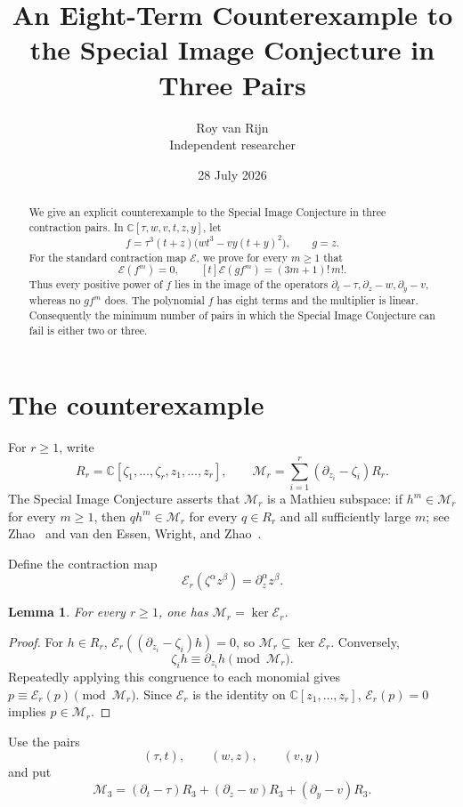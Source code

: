 \documentclass[11pt]{article}
\title{An Eight-Term Counterexample to the Special Image Conjecture
  in Three Pairs}
\author{Roy van Rijn\\{\small Independent researcher}}
\date{28 July 2026}
\newtheorem{lemma}[theorem]{Lemma}
\newcommand{\C}{\mathbb C}
\newcommand{\Eop}{\mathcal E}
\newcommand{\M}{\mathcal M}
\begin{document}
\maketitle

\begin{abstract}
We give an explicit counterexample to the Special Image Conjecture in
three contraction pairs.  In
\(\C[\tau,w,v,t,z,y]\), let
\[
 f=\tau^3(t+z)\bigl(wt^3-vy(t+y)^2\bigr),\qquad g=z.
\]
For the standard contraction map \(\Eop\), we prove for every \(m\geq1\)
that
\[
 \Eop(f^m)=0,\qquad [t]\Eop(gf^m)=(3m+1)!\,m!.
\]
Thus every positive power of \(f\) lies in the image of the operators
\(\partial_t-\tau,\partial_z-w,\partial_y-v\), whereas no \(gf^m\)
does.  The polynomial \(f\) has eight terms and the multiplier is linear.
Consequently the minimum number of pairs in which the Special Image
Conjecture can fail is either two or three.
\end{abstract}

\section{The counterexample}

For \(r\geq1\), write
\[
 R_r=\C[\zeta_1,\ldots,\zeta_r,z_1,\ldots,z_r],
 \qquad
 \M_r=\sum_{i=1}^r(\partial_{z_i}-\zeta_i)R_r.
\]
The Special Image Conjecture asserts that \(\M_r\) is a Mathieu
subspace: if \(h^m\in\M_r\) for every \(m\geq1\), then
\(qh^m\in\M_r\) for every \(q\in R_r\) and all sufficiently large
\(m\); see Zhao~\cite{Zhao2010} and van den Essen, Wright, and
Zhao~\cite{EWZ2011}.

Define the contraction map
\[
 \Eop_r(\zeta^\alpha z^\beta)=\partial_z^\alpha z^\beta.
\]

\begin{lemma}\label{lem:kernel}
For every \(r\geq1\), one has \(\M_r=\ker\Eop_r\).
\end{lemma}

\begin{proof}
For \(h\in R_r\),
\(\Eop_r((\partial_{z_i}-\zeta_i)h)=0\), so
\(\M_r\subseteq\ker\Eop_r\).  Conversely,
\[
 \zeta_i h\equiv\partial_{z_i}h\pmod{\M_r}.
\]
Repeatedly applying this congruence to each monomial gives
\(p\equiv\Eop_r(p)\pmod{\M_r}\).  Since \(\Eop_r\) is the identity on
\(\C[z_1,\ldots,z_r]\), \(\Eop_r(p)=0\) implies \(p\in\M_r\).
\end{proof}

Use the pairs
\[
 (\tau,t),\qquad(w,z),\qquad(v,y)
\]
and put
\[
 \M_3=(\partial_t-\tau)R_3+
       (\partial_z-w)R_3+
       (\partial_y-v)R_3.
\]
\end{document}
